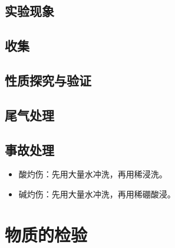 \documentclass[a4paper]{article}
\begin{document}
	
	\subsection{实验现象}
	
	
	\subsection{收集}
	
	
	\subsection{性质探究与验证}
	
	
	\subsection{尾气处理}
	
	
	\subsection{事故处理}
	
	\begin{itemize}
		\item 酸灼伤：先用大量水冲洗，再用稀浸洗。
		\item 碱灼伤：先用大量水冲洗，再用稀硼酸浸。
	\end{itemize}
	
	
	\clearpage
	\section{物质的检验}
	
	
\end{document}

